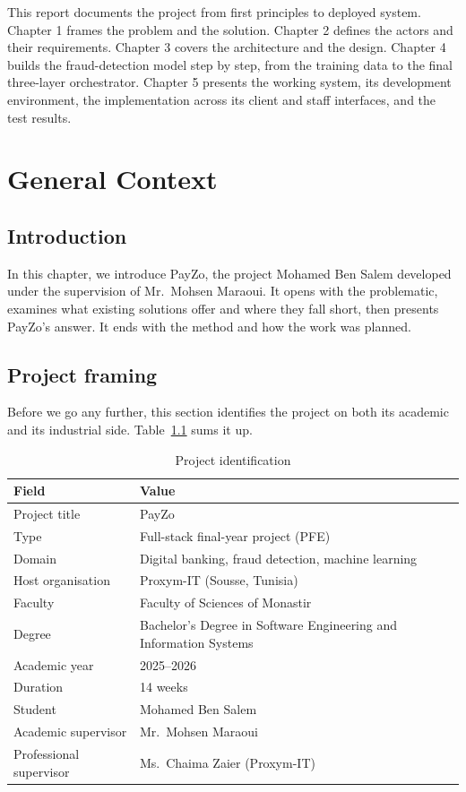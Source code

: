 \documentclass[12pt,a4paper]{report}
\begin{document}
This report documents the project from first principles to deployed system. Chapter 1 frames
the problem and the solution. Chapter 2 defines the actors and their requirements. Chapter 3
covers the architecture and the design. Chapter 4 builds the fraud-detection model step by
step, from the training data to the final three-layer orchestrator. Chapter 5 presents the
working system, its development environment, the implementation across its client and staff
interfaces, and the test results.

\chapter{General Context}
\label{chap:context}

\section{Introduction}

In this chapter, we introduce PayZo, the project Mohamed Ben Salem developed under
the supervision of Mr.\ Mohsen Maraoui. It opens with the problematic, examines what
existing solutions offer and where they fall short, then presents PayZo's answer. It ends
with the method and how the work was planned.

\section{Project framing}

Before we go any further, this section identifies the project on both its academic and its
industrial side. Table~\ref{tab:project-id} sums it up.

\begin{table}[H]
\centering
\begin{tabular}{|l|l|}
\hline
\textbf{Field} & \textbf{Value} \\
\hline
Project title & PayZo \\
\hline
Type & Full-stack final-year project (PFE) \\
\hline
Domain & Digital banking, fraud detection, machine learning \\
\hline
Host organisation & Proxym-IT (Sousse, Tunisia) \\
\hline
Faculty & Faculty of Sciences of Monastir \\
\hline
Degree & Bachelor's Degree in Software Engineering and Information Systems \\
\hline
Academic year & 2025--2026 \\
\hline
Duration & 14 weeks \\
\hline
Student & Mohamed Ben Salem \\
\hline
Academic supervisor & Mr.\ Mohsen Maraoui \\
\hline
Professional supervisor & Ms.\ Chaima Zaier (Proxym-IT) \\
\hline
\end{tabular}
\caption{Project identification}
\label{tab:project-id}
\end{table}
\end{document}
